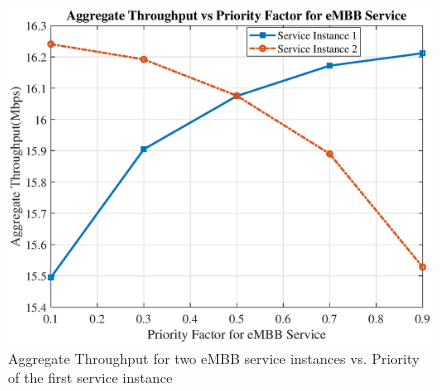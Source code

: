 \documentclass[lettersize,journal]{IEEEtran}
\begin{document}
\begin{figure}%
  \centering
  \captionsetup{justification=centering}
        \includegraphics[scale = 0.3]{priorityLast.eps}
  \caption{Aggregate Throughput for two eMBB service instances vs. Priority of the first service instance }
  \label{fig:9}

\end{figure}
\end{document}
